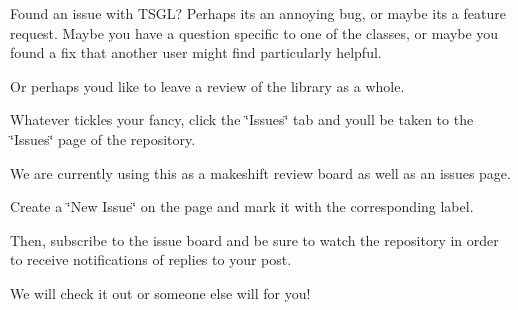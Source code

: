 Found an issue with T\+S\+G\+L? Perhaps its an annoying bug, or maybe its a feature request. Maybe you have a question specific to one of the classes, or maybe you found a fix that another user might find particularly helpful.

Or perhaps you\textquotesingle{}d like to leave a review of the library as a whole.

Whatever tickles your fancy, click the \char`\"{}\+Issues\char`\"{} tab and you\textquotesingle{}ll be taken to the \char`\"{}\+Issues\char`\"{} page of the repository.

We are currently using this as a makeshift review board as well as an issues page.

Create a \char`\"{}\+New Issue\char`\"{} on the page and mark it with the corresponding label.

Then, subscribe to the issue board and be sure to watch the repository in order to receive notifications of replies to your post.

We will check it out or someone else will for you! 